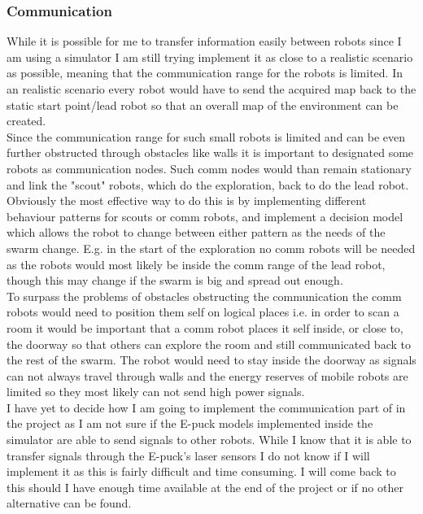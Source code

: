 \documentclass[10pt,a4paper]{article}
\begin{document}
\begin{flushleft}
\subsubsection{Communication}
While it is possible for me to transfer information easily between robots since I am using a simulator I am still trying implement it as close to a realistic scenario as possible, meaning that the communication range for the robots is limited. In an realistic scenario every robot would have to send the acquired map back to the static start point/lead robot so that an overall map of the environment can be created. \\
Since the communication range for such small robots is limited and can be even further obstructed through obstacles like walls it is important to designated some robots as communication nodes. Such comm nodes would than remain stationary and link the "scout" robots, which do the exploration, back to do the lead robot. \\
Obviously the most effective way to do this is by implementing different behaviour patterns for scouts or comm robots, and implement a decision model which allows the robot to change between either pattern as the needs of the swarm change. E.g. in the start of the exploration no comm robots will be needed as the robots would most likely be inside the comm range of the lead robot, though this may change if the swarm is big and spread out enough. \\[3ex]

To surpass the problems of obstacles obstructing the communication the comm robots would need to position them self on logical places i.e. in order to scan a room it would be important that a comm robot places it self inside, or close to, the doorway so that others can explore the room and still communicated back to the rest of the swarm. The robot would need to stay inside the doorway as signals can not always travel through walls and the energy reserves of mobile robots are limited so they most likely can not send high power signals. \\
I have yet to decide how I am going to implement the communication part of in the project as I am not sure if the E-puck models implemented inside the simulator are able to send signals to other robots. While I know that it is able to transfer signals through the E-puck's laser sensors I do not know if I will implement it as this is fairly difficult and time consuming. I will come back to this should I have enough time available at the end of the project or if no other alternative can be found.\\[3ex]


\end{flushleft}
\end{document}
